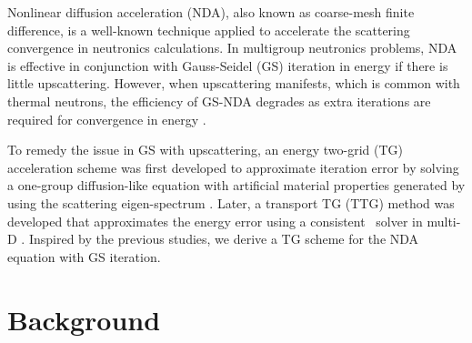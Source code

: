 Nonlinear diffusion acceleration (NDA), also known as coarse-mesh finite difference, is a well-known technique applied to accelerate the scattering convergence in neutronics calculations. In multigroup neutronics problems, NDA is effective in conjunction with Gauss-Seidel (GS) iteration in energy if there is little upscattering. However, when upscattering manifests, which is common with thermal neutrons, the efficiency of GS-NDA degrades as extra iterations are required for convergence in energy \cite{park-nda}.

To remedy the issue in GS with upscattering, an energy two-grid (TG) acceleration scheme was first developed to approximate iteration error by solving a one-group diffusion-like equation with artificial material properties generated by using the scattering eigen-spectrum \cite{morel-upscat}. Later, a transport TG (TTG) method was developed that approximates the energy error using a consistent \sn\ solver in multi-D \cite{evans-upscat}. Inspired by the previous studies, we derive a TG scheme for the NDA equation with GS iteration.

\section{Background}
